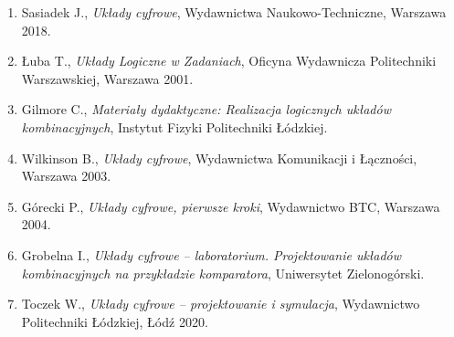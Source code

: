 \documentclass[12pt,a4paper]{article}
\begin{document}
\begin{enumerate}
    \item Sasiadek J., \textit{Układy cyfrowe}, Wydawnictwa Naukowo-Techniczne, Warszawa 2018.
    \item Łuba T., \textit{Układy Logiczne w Zadaniach}, Oficyna Wydawnicza Politechniki Warszawskiej, Warszawa 2001.
    \item Gilmore C., \textit{Materiały dydaktyczne: Realizacja logicznych układów kombinacyjnych}, Instytut Fizyki Politechniki Łódzkiej.
    \item Wilkinson B., \textit{Układy cyfrowe}, Wydawnictwa Komunikacji i Łączności, Warszawa 2003.
    \item Górecki P., \textit{Układy cyfrowe, pierwsze kroki}, Wydawnictwo BTC, Warszawa 2004.
    \item Grobelna I., \textit{Układy cyfrowe -- laboratorium. Projektowanie układów kombinacyjnych na przykładzie komparatora}, Uniwersytet Zielonogórski.
    \item Toczek W., \textit{Układy cyfrowe -- projektowanie i symulacja}, Wydawnictwo Politechniki Łódzkiej, Łódź 2020.
\end{enumerate}
\end{document}
